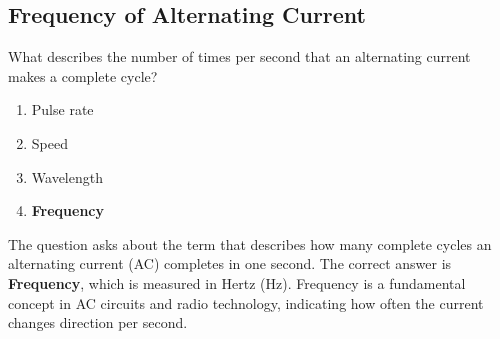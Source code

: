 \subsection{Frequency of Alternating Current}
\label{T5A12}

\begin{tcolorbox}[colback=gray!10!white,colframe=black!75!black,title=T5A12]
What describes the number of times per second that an alternating current makes a complete cycle?
\begin{enumerate}[noitemsep]
    \item Pulse rate
    \item Speed
    \item Wavelength
    \item \textbf{Frequency}
\end{enumerate}
\end{tcolorbox}

The question asks about the term that describes how many complete cycles an alternating current (AC) completes in one second. The correct answer is \textbf{Frequency}, which is measured in Hertz (Hz). Frequency is a fundamental concept in AC circuits and radio technology, indicating how often the current changes direction per second.